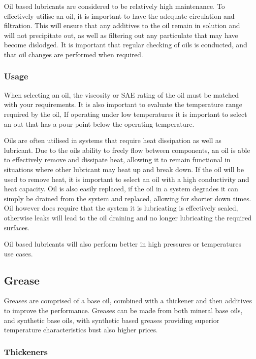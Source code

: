 \documentclass[a4paper,11pt]{article}
\begin{document}
Oil based lubricants are considered to be relatively high maintenance. To effectively utilise an oil, it is important to have the adequate circulation and filtration. This will ensure that any additives to the oil remain in solution and will not precipitate out, as well as filtering out any particulate that may have become dislodged. It is important that regular checking of oils is conducted, and that oil changes are performed when required.    

\subsubsection{Usage}

When selecting an oil, the viscosity or SAE rating of the oil must be matched with your requirements. It is also important to evaluate the temperature range required by the oil, If operating under low temperatures it is important to select an out that has a pour point below the operating temperature.  

Oils are often utilised in systems that require heat dissipation as well as lubricant. Due to the oils ability to freely flow between components, an oil is able to effectively remove and dissipate heat, allowing it to remain functional in situations where other lubricant may heat up and break down. If the oil will be used to remove heat, it is important to select an oil with a high conductivity and heat capacity. Oil is also easily replaced, if the oil in a system degrades it can simply be drained from the system and replaced, allowing for shorter down times. Oil however does require that the system it is lubricating is effectively sealed, otherwise leaks will lead to the oil draining and no longer lubricating the required surfaces.

Oil based lubricants will also perform better in high pressures or temperatures use cases.

\subsection{Grease}

Greases are comprised of a base oil, combined with a thickener and then additives to improve the performance. Greases can be made from both mineral base oils, and synthetic base oils, with synthetic based greases providing superior temperature characteristics bust also higher prices. 

\subsubsection{Thickeners}
\end{document}
